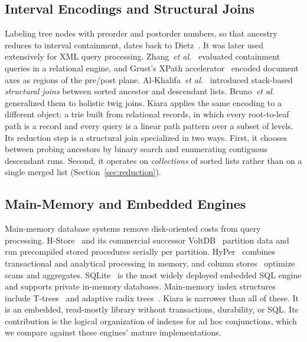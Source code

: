 \subsection{Interval Encodings and Structural Joins}
Labeling tree nodes with preorder and postorder numbers, so that ancestry reduces to interval containment, dates back to Dietz~\cite{dietz1982maintaining}. It was later used extensively for XML query processing. Zhang~\emph{et al.}~\cite{zhang2001supporting} evaluated containment queries in a relational engine, and Grust's XPath accelerator~\cite{grust2002accelerating} encoded document axes as regions of the pre/post plane. Al-Khalifa~\emph{et al.}~\cite{alkhalifa2002structural} introduced stack-based \emph{structural joins} between sorted ancestor and descendant lists. Bruno~\emph{et al.}~\cite{bruno2002holistic} generalized them to holistic twig joins. Kiara applies the same encoding to a different object: a trie built from relational records, in which every root-to-leaf path is a record and every query is a linear path pattern over a subset of levels. Its reduction step is a structural join specialized in two ways. First, it chooses between probing ancestors by binary search and enumerating contiguous descendant runs. Second, it operates on \emph{collections} of sorted lists rather than on a single merged list (Section~\ref{sec:reduction}).

\subsection{Main-Memory and Embedded Engines}
Main-memory database systems remove disk-oriented costs from query processing. H-Store~\cite{kallman2008hstore} and its commercial successor VoltDB~\cite{stonebraker2013voltdb} partition data and run precompiled stored procedures serially per partition. HyPer~\cite{kemper2011hyper} combines transactional and analytical processing in memory, and column stores~\cite{boncz2008breaking,abadi2008columnstores} optimize scans and aggregates. SQLite~\cite{gaffney2022sqlite} is the most widely deployed embedded SQL engine and supports private in-memory databases. Main-memory index structures include T-trees~\cite{lehman1986study} and adaptive radix trees~\cite{leis2013art}. Kiara is narrower than all of these. It is an embedded, read-mostly library without transactions, durability, or SQL. Its contribution is the logical organization of indexes for ad hoc conjunctions, which we compare against these engines' mature implementations.

